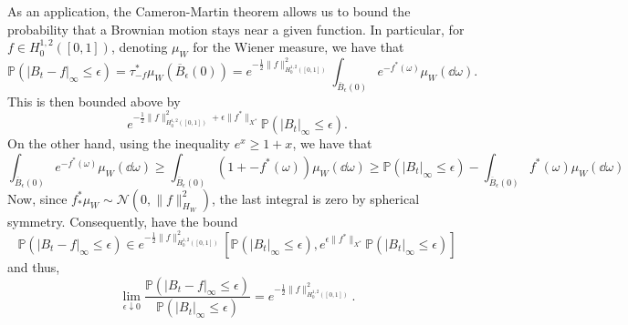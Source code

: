 \documentclass[]{article}
\theoremstyle{definition}
\theoremstyle{definition}
\begin{document}
As an application, the Cameron-Martin theorem allows us to bound the probability that a Brownian motion 
stays near a given function. In particular, for \(f \in H^{1, 2}_0([0, 1])\), denoting \(\mu_W\) for the 
Wiener measure, we have that
\[\mathbb{P}(|B_t - f|_\infty \le \epsilon) = \tau_{-f}^* \mu_W(\overline B_\epsilon(0))
  = e^{-\frac{1}{2}\|f\|^2_{H^{1, 2}_0([0, 1])}} \int_{\overline B_\epsilon(0)} e^{- f^*(\omega)} \mu_W(\dd \omega).\]
This is then bounded above by 
\[e^{-\frac{1}{2}\|f\|^2_{H^{1, 2}_0([0, 1])} + \epsilon \|f^*\|_{X^*}} \mathbb{P}(|B_t|_\infty \le \epsilon).\]
On the other hand, using the inequality \(e^x \ge 1 + x\), we have that 
\[\int_{\overline B_\epsilon(0)} e^{- f^*(\omega)} \mu_W(\dd \omega) \ge 
  \int_{\overline B_\epsilon(0)} (1 + - f^*(\omega)) \mu_W(\dd \omega)
  \ge \mathbb{P}(|B_t|_\infty \le \epsilon) - \int_{\overline B_\epsilon(0)} f^*(\omega) \mu_W(\dd \omega)\]
Now, since \(f^*_* \mu_W \sim \mathcal{N}(0, \|f\|_{H_W}^2)\), the last integral is zero by spherical symmetry. 
Consequently, have the bound 
\[\mathbb{P}(|B_t - f|_\infty \le \epsilon) \in 
  e^{-\frac{1}{2}\|f\|^2_{H^{1, 2}_0([0, 1])}} 
  \left[\mathbb{P}(|B_t|_\infty \le \epsilon), e^{\epsilon \|f^*\|_{X^*}}\mathbb{P}(|B_t|_\infty \le \epsilon)\right]\]
and thus, 
\[\lim_{\epsilon \downarrow 0} \frac{\mathbb{P}(|B_t - f|_\infty \le \epsilon)}{\mathbb{P}(|B_t|_\infty \le \epsilon)} 
  = e^{-\frac{1}{2}\|f\|^2_{H^{1, 2}_0([0, 1])}}.\]
\end{document}
